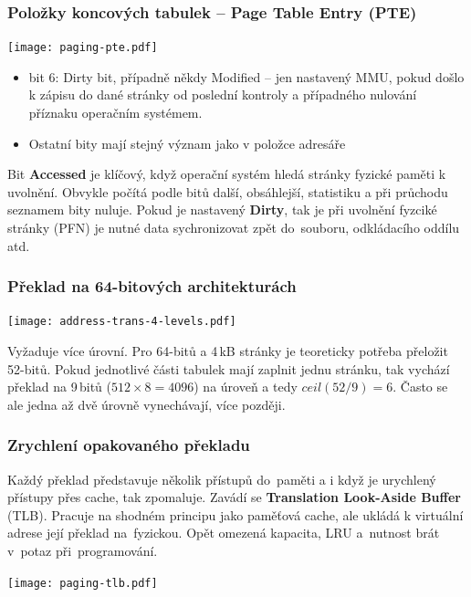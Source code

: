 \documentclass{beamer}
\begin{document}
\begin{frame}
\frametitle{Položky koncových tabulek -- \textbf{Page Table Entry} (PTE)}

{
\centering

\texttt{[image: paging-pte.pdf]}

}

\vskip 2mm

\begin{itemize}
\item bit 6: Dirty bit, případně někdy Modified – jen nastavený MMU, pokud došlo k zápisu do dané stránky od poslední kontroly a případného nulování příznaku operačním systémem.
\item Ostatní bity mají stejný význam jako v položce adresáře
\end{itemize}

Bit \textbf{Accessed} je klíčový, když operační systém hledá stránky fyzické paměti k uvolnění.
Obvykle počítá podle bitů další, obsáhlejší, statistiku a při průchodu seznamem bity nuluje.
Pokud je nastavený \textbf{Dirty}, tak je při uvolnění fyzciké stránky (PFN) je nutné data
sychronizovat zpět do~souboru, odkládacího oddílu atd.

\end{frame}


\begin{frame}
\frametitle{Překlad na 64-bitových architekturách}

{
\centering

\texttt{[image: address-trans-4-levels.pdf]}

}

Vyžaduje více úrovní. Pro 64-bitů a 4\,kB stránky je teoreticky
potřeba přeložit 52-bitů. Pokud jednotlivé části tabulek mají
zaplnit jednu stránku, tak vychází překlad na 9\,bitů ($512 \times 8 = 4096$)
na úroveň a tedy $ceil(52 / 9) = 6$. Často se ale jedna až dvě úrovně vynechávají, více později.


\end{frame}

\begin{frame}
\frametitle{Zrychlení opakovaného překladu}

Každý překlad představuje několik přístupů do~paměti a i když je urychlený
přístupy přes cache, tak zpomaluje. Zavádí se \textbf{Translation Look-Aside Buffer} (TLB).
Pracuje na shodném principu jako paměťová cache, ale ukládá k virtuální adrese
její překlad na~fyzickou. Opět omezená kapacita, LRU a~nutnost brát v~potaz
při~programování.

\vskip 2mm

{
\centering

\texttt{[image: paging-tlb.pdf]}

}
\end{frame}
\end{document}
